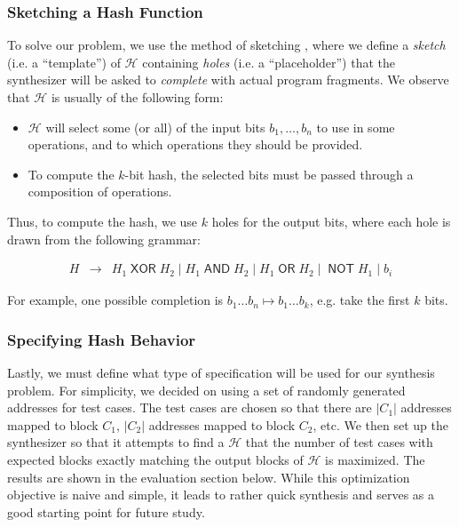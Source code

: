 \subsubsection{Sketching a Hash Function}

To solve our problem, we use the method of sketching
\cite{solar-lezama-sketching}, where we define a \textit{sketch} (i.e. a
``template'') of $\mathcal{H}$ containing \textit{holes} (i.e. a
``placeholder'') that the synthesizer will be asked to \textit{complete} with
actual program fragments. We observe that $\mathcal{H}$ is usually of the
following form:
\begin{itemize}
\item $\mathcal{H}$ will select some (or all) of the input bits $b_1, \dots,
  b_n$ to use in some operations, and to which operations they should be
  provided.
\item To compute the $k$-bit hash, the selected bits must be passed through a
  composition of operations.
\end{itemize}
Thus, to compute the hash, we use $k$ holes for the output bits, where each hole
is drawn from the following grammar:

\newcommand{\bop}[1]{\mathop{\mathsf{#1}}}
\[
\begin{array}{rcl}
  H &\to& H_1 \bop{XOR} H_2 \mid H_1 \bop{AND} H_2 \mid H_1 \bop{OR} H_2
          \mid \bop{NOT} H_1 \mid b_i
\end{array}
\]

For example, one possible completion is $b_1 \dots b_n \mapsto b_1\dots b_k$,
e.g. take the first $k$ bits.

\subsubsection{Specifying Hash Behavior}

Lastly, we must define what type of specification will be used for our synthesis
problem. For simplicity, we decided on using a set of randomly generated
addresses for test cases. The test cases are chosen so that there are $|C_1|$
addresses mapped to block $C_1$, $|C_2|$ addresses mapped to block $C_2$, etc.
We then set up the synthesizer so that it attempts to find a $\mathcal{H}$ that
the number of test cases with expected blocks exactly matching the output blocks
of $\mathcal{H}$ is maximized. The results are shown in the evaluation section
below. While this optimization objective is naive and simple, it leads to rather
quick synthesis and serves as a good starting point for future study.

